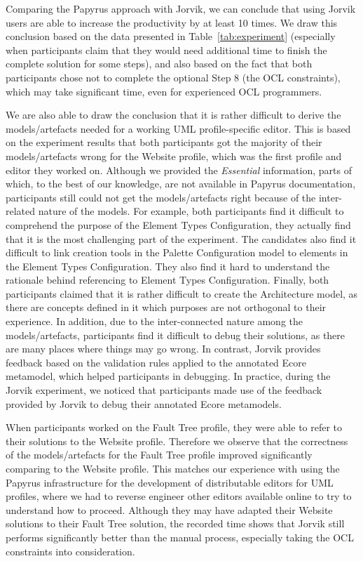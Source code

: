 Comparing the Papyrus approach with Jorvik, we can conclude that using Jorvik users are able to increase the productivity by at least 10 times. 
We draw this conclusion based on the data presented in Table~\ref{tab:experiment} (especially when participants claim that they would need additional time to finish the complete solution for some steps), and also based on the fact that both participants chose not to complete the optional Step 8 (the OCL constraints), which may take significant time, even for experienced OCL programmers.

We are also able to draw the conclusion that it is rather difficult to derive the models/artefacts needed for a working UML profile-specific editor. 
This is based on the experiment results that both participants got the majority of their models/artefacts wrong for the Website profile, which was the first profile and editor they worked on.
Although we provided the \textit{Essential} information, parts of which, to the best of our knowledge, are not available in Papyrus documentation, participants still could not get the models/artefacts right because of the inter-related nature of the models.
For example, both participants find it difficult to comprehend the purpose of the Element Types Configuration, they actually find that it is the most challenging part of the experiment.
The candidates also find it difficult to link creation tools in the Palette Configuration model to elements in the Element Types Configuration. 
They also find it hard to understand the rationale behind referencing to Element Types Configuration.
Finally, both participants claimed that it is rather difficult to create the Architecture model, as there are concepts defined in it which purposes are not orthogonal to their experience.
In addition, due to the inter-connected nature among the models/artefacts, participants find it difficult to debug their solutions, as there are many places where things may go wrong.
In contrast, Jorvik provides feedback based on the validation rules applied to the annotated Ecore metamodel, which helped participants in debugging.
In practice, during the Jorvik experiment, we noticed that participants made use of the feedback provided by Jorvik to debug their annotated Ecore metamodels.

When participants worked on the Fault Tree profile, they were able to refer to their solutions to the Website profile. 
Therefore we observe that the correctness of the models/artefacts for the Fault Tree profile improved significantly comparing to the Website profile. This matches our experience with using the Papyrus infrastructure for the development of distributable editors for UML profiles, where we had to reverse engineer other editors available online to try to understand how to proceed.
Although they may have adapted their Website solutions to their Fault Tree solution, the recorded time shows that Jorvik still performs significantly better than the manual process, especially taking the OCL constraints into consideration.

